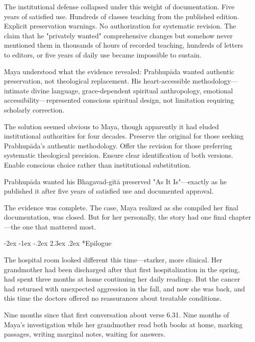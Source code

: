 \documentclass[12pt,twoside]{book}
\makeatletter
\renewcommand\section{\@startsection{section}{1}{\z@}%
{-2ex \@plus -1ex \@minus -.2ex}%
{2.3ex \@plus.2ex}%
{\normalfont\Large\bfseries}}
\makeatother
\begin{document}
The institutional defense collapsed under this weight of documentation. Five years of satisfied use. Hundreds of classes teaching from the published edition. Explicit preservation warnings. No authorization for systematic revision. The claim that he "privately wanted" comprehensive changes but somehow never mentioned them in thousands of hours of recorded teaching, hundreds of letters to editors, or five years of daily use became impossible to sustain.

Maya understood what the evidence revealed: Prabhupāda wanted authentic preservation, not theological replacement. His heart-accessible methodology—intimate divine language, grace-dependent spiritual anthropology, emotional accessibility—represented conscious spiritual design, not limitation requiring scholarly correction.

The solution seemed obvious to Maya, though apparently it had eluded institutional authorities for four decades. Preserve the original for those seeking Prabhupāda's authentic methodology. Offer the revision for those preferring systematic theological precision. Ensure clear identification of both versions. Enable conscious choice rather than institutional substitution.

Prabhupāda wanted his Bhagavad-gītā preserved "As It Is"—exactly as he published it after five years of satisfied use and documented approval.

The evidence was complete. The case, Maya realized as she compiled her final documentation, was closed. But for her personally, the story had one final chapter—the one that mattered most.

\clearpage
{}
\section*{Epilogue}
\thispagestyle{chapterpage}

\normalfont\justifying

The hospital room looked different this time—starker, more clinical. Her grandmother had been discharged after that first hospitalization in the spring, had spent three months at home continuing her daily readings. But the cancer had returned with unexpected aggression in the fall, and now she was back, and this time the doctors offered no reassurances about treatable conditions.

Nine months since that first conversation about verse 6.31. Nine months of Maya's investigation while her grandmother read both books at home, marking passages, writing marginal notes, waiting for answers.
\end{document}

